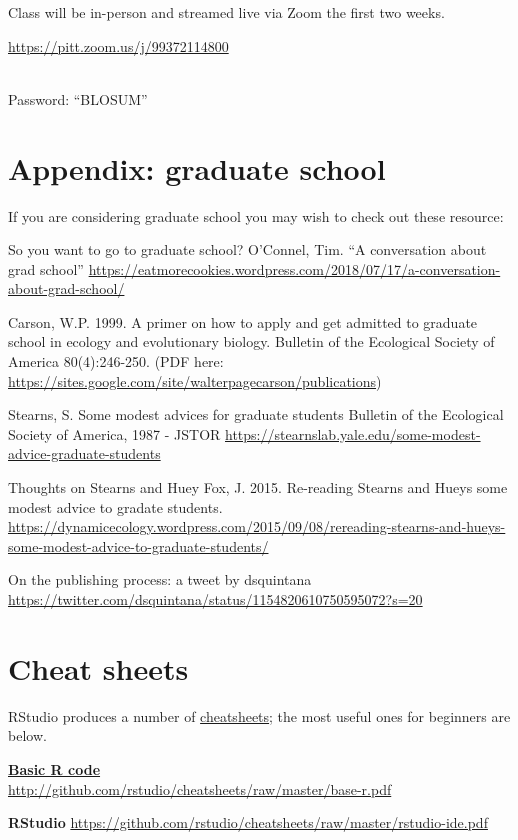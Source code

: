 \documentclass[
]{book}
\begin{document}
Class will be in-person and streamed live via Zoom the first two weeks.

\url{https://pitt.zoom.us/j/99372114800}\strut \\
Password: ``BLOSUM''

\hypertarget{appendix-graduate-school}{%
\chapter{Appendix: graduate school}\label{appendix-graduate-school}}

If you are considering graduate school you may wish to check out these resource:

So you want to go to graduate school?
O'Connel, Tim. ``A conversation about grad school'' \url{https://eatmorecookies.wordpress.com/2018/07/17/a-conversation-about-grad-school/}

Carson, W.P. 1999. A primer on how to apply and get admitted to graduate school in ecology and evolutionary biology. Bulletin of the Ecological Society of America 80(4):246-250. (PDF here: \url{https://sites.google.com/site/walterpagecarson/publications})

Stearns, S. Some modest advices for graduate students
Bulletin of the Ecological Society of America, 1987 - JSTOR
\url{https://stearnslab.yale.edu/some-modest-advice-graduate-students}

Thoughts on Stearns and Huey
Fox, J. 2015. Re-reading Stearns and Hueys some modest advice to gradate students.
\url{https://dynamicecology.wordpress.com/2015/09/08/rereading-stearns-and-hueys-some-modest-advice-to-graduate-students/}

On the publishing process: a tweet by dsquintana
\url{https://twitter.com/dsquintana/status/1154820610750595072?s=20}

\hypertarget{cheat-sheets}{%
\chapter{Cheat sheets}\label{cheat-sheets}}

RStudio produces a number of \href{https://www.rstudio.com/resources/cheatsheets/\#ide}{cheatsheets}; the most useful ones for beginners are below.

\href{http://github.com/rstudio/cheatsheets/raw/master/base-r.pdf}{\textbf{Basic R code}}\\
\url{http://github.com/rstudio/cheatsheets/raw/master/base-r.pdf}

\textbf{RStudio}
\url{https://github.com/rstudio/cheatsheets/raw/master/rstudio-ide.pdf}
\end{document}

